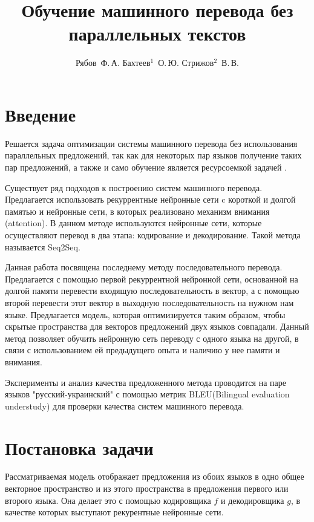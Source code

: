\documentclass[12pt,twoside]{article}
\title
    [Обучение машинного перевода без параллельных текстов] %
    {Обучение машинного перевода без параллельных текстов}
\author
    [Рябов~Ф.\,А. Бахтеев$^1$~О.\,Ю.  Стрижов$^2$~В.\,В.] %
    {Рябов~Ф.\,А. Бахтеев$^1$~О.\,Ю.  Стрижов$^2$~В.\,В.} %
    [Рябов~Ф.\,А. Бахтеев$^1$~О.\,Ю.  Стрижов$^2$~В.\,В.] %
\begin{document}
\maketitle

\section{Введение}
{Решается задача оптимизации системы машинного перевода без использования параллельных предложений, так как для некоторых пар языков получение таких пар предложений, а также и само обучение является ресурсоемкой задачей \cite{conneau2017word}. 

Существует ряд подходов к построению систем машинного перевода\cite{koehn2007moses,koehn2009statistical,wu2016google}. Предлагается использовать рекуррентные нейронные сети c короткой и долгой памятью и нейронные сети, в которых реализовано механизм внимания (attention). В данном методе используются нейронные сети, которые осуществляют перевод в два этапа: кодирование и декодирование. Такой метода называется Seq2Seq\cite{weiss2017sequence, sutskever2014sequence}.

Данная работа посвящена последнему методу последовательного перевода. Предлагается с помощью первой рекуррентной нейронной сети, основанной на долгой памяти перевести входящую последовательность в вектор, а с помощью второй перевести этот вектор в выходную последовательность на нужном нам языке\cite{cho2014properties}. Предлагается модель, которая оптимизируется таким образом, чтобы скрытые пространства для векторов предложений двух языков совпадали.
 Данный метод позволяет обучить нейронную сеть переводу с одного языка на другой, в связи с использованием ей предыдущего опыта и наличию у нее памяти и внимания.

Эксперименты и анализ качества предложенного метода проводится на паре языков "русский-украинский" с помощью метрик BLEU(Bilingual evaluation understudy) для проверки качества систем машинного перевода\cite{papineni2002bleu}.}


\section{Постановка задачи}

Рассматриваемая модель отображает предложения из обоих языков в одно общее векторное пространство и из этого пространства в предложения первого или второго языка. Она делает это с помощью кодировщика $f$ и декодировщика $g$, в качестве которых выступают рекурентные нейронные сети.
\end{document}
